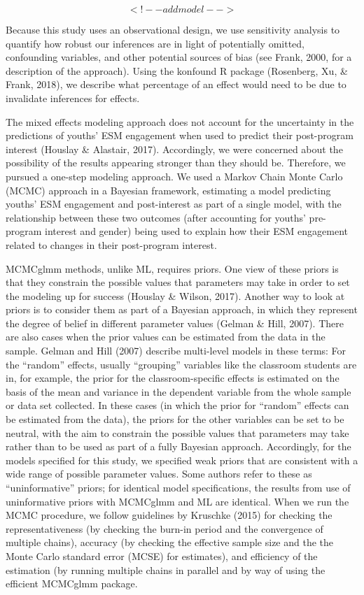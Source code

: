 \documentclass[man]{apa6}
\theoremstyle{definition}
\theoremstyle{definition}
\theoremstyle{definition}
\theoremstyle{remark}
\begin{document}
\[
<!-- add model -->
\]

Because this study uses an observational design, we use sensitivity
analysis to quantify how robust our inferences are in light of
potentially omitted, confounding variables, and other potential sources
of bias (see Frank, 2000, for a description of the approach). Using the
konfound R package (Rosenberg, Xu, \& Frank, 2018), we describe what
percentage of an effect would need to be due to invalidate inferences
for effects.

The mixed effects modeling approach does not account for the uncertainty
in the predictions of youths' ESM engagement when used to predict their
post-program interest (Houslay \& Alastair, 2017). Accordingly, we were
concerned about the possibility of the results appearing stronger than
they should be. Therefore, we pursued a one-step modeling approach. We
used a Markov Chain Monte Carlo (MCMC) approach in a Bayesian framework,
estimating a model predicting youths' ESM engagement and post-interest
as part of a single model, with the relationship between these two
outcomes (after accounting for youths' pre-program interest and gender)
being used to explain how their ESM engagement related to changes in
their post-program interest.

MCMCglmm methods, unlike ML, requires priors. One view of these priors
is that they constrain the possible values that parameters may take in
order to set the modeling up for success (Houslay \& Wilson, 2017).
Another way to look at priors is to consider them as part of a Bayesian
approach, in which they represent the degree of belief in different
parameter values (Gelman \& Hill, 2007). There are also cases when the
prior values can be estimated from the data in the sample. Gelman and
Hill (2007) describe multi-level models in these terms: For the
\enquote{random} effects, usually \enquote{grouping} variables like the
classroom students are in, for example, the prior for the
classroom-specific effects is estimated on the basis of the mean and
variance in the dependent variable from the whole sample or data set
collected. In these cases (in which the prior for \enquote{random}
effects can be estimated from the data), the priors for the other
variables can be set to be neutral, with the aim to constrain the
possible values that parameters may take rather than to be used as part
of a fully Bayesian approach. Accordingly, for the models specified for
this study, we specified weak priors that are consistent with a wide
range of possible parameter values. Some authors refer to these as
\enquote{uninformative} priors; for identical model specifications, the
results from use of uninformative priors with MCMCglmm and ML are
identical. When we run the MCMC procedure, we follow guidelines by
Kruschke (2015) for checking the representativeness (by checking the
burn-in period and the convergence of multiple chains), accuracy (by
checking the effective sample size and the the Monte Carlo standard
error (MCSE) for estimates), and efficiency of the estimation (by
running multiple chains in parallel and by way of using the efficient
MCMCglmm package.
\end{document}
